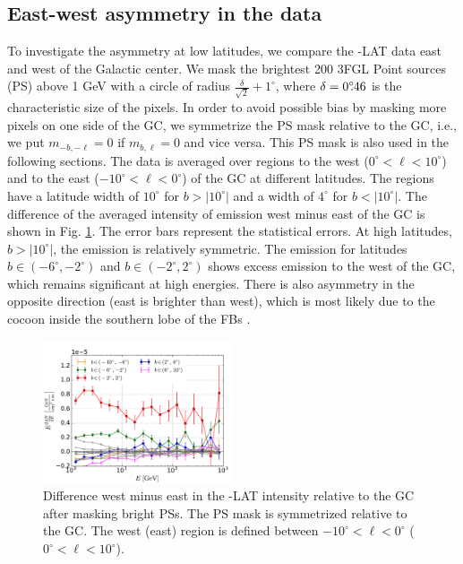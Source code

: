 \subsection{East-west  asymmetry in the data}
\label{sec:data_diff}

To investigate the asymmetry at low latitudes, we compare the \Fermi-LAT data east and west of the Galactic center. 
We mask the brightest 200 3FGL Point sources (PS) above 1 GeV
with a circle of radius $\frac{\delta}{\sqrt{2}} + 1^\circ$, where $\delta = 0^\circ\!\!.46$ is the characteristic size of the pixels. 
In order to avoid possible bias by masking more pixels on one side of the GC,
we symmetrize the PS mask relative to the GC, i.e., we put $m_{-b, -\ell} = 0$ if $m_{b, \ell} = 0$ and vice versa.
This PS mask is also used in the following sections. 
The data is averaged over regions to the west ($0^\circ < \ell < 10^\circ$) and to the east ($-10^\circ < \ell  <  0^\circ$) 
of the GC at different latitudes. The regions have a latitude width of $10^\circ$ for $b >|10^\circ|$ and a width of  $4^\circ$ for  $b <|10^\circ|$. 
The difference of the averaged intensity of emission west minus east of the GC is shown in Fig. \ref{fig:data_diff}. 
The error bars represent the statistical errors.
At high latitudes, $b >|10^\circ|$, the emission is relatively symmetric. 
The emission for latitudes $b \in (-6^\circ, -2^\circ)$ and $b \in (-2^\circ, 2^\circ)$ shows excess emission to the west of the GC, 
which remains significant at high energies. 
There is also asymmetry in the opposite direction (east is brighter than west), which is most likely due to the cocoon inside the 
southern lobe of the FBs \citep{2012ApJ...753...61S, 2014ApJ...793...64A}.

\begin{figure}[h]
\centering
 \includegraphics[width=0.5\textwidth]{plots/Difference_data_for_different_latitudes.pdf}
 \caption{Difference west minus east in the \Fermi-LAT intensity relative to the GC after masking bright PSs.
 The PS mask is symmetrized relative to the GC.
 The west (east) region is defined between $-10^\circ < \ell <0^\circ$ ($0^\circ < \ell <10^\circ$). }
 \label{fig:data_diff}
\end{figure}

